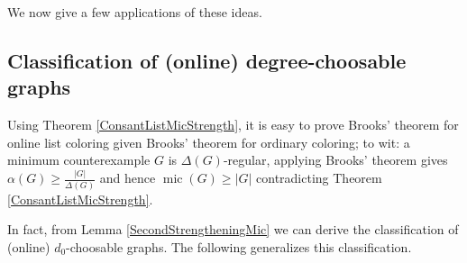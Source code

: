 \documentclass[12pt]{article}
\theoremstyle{plain}
\theoremstyle{definition}
\theoremstyle{remark}
\newcommand{\mic}{\operatorname{mic}}
\begin{document}
\noindent We now give a few applications of these ideas.

\subsection{Classification of (online) degree-choosable graphs}
Using Theorem \ref{ConsantListMicStrength}, it is easy to prove Brooks' theorem for online list coloring given Brooks' theorem for ordinary coloring; to wit: a minimum counterexample $G$ is $\Delta(G)$-regular, applying Brooks' theorem gives $\alpha(G) \ge \frac{|G|}{\Delta(G)}$ and hence $\mic(G) \ge |G|$ contradicting Theorem \ref{ConsantListMicStrength}.

In fact, from Lemma \ref{SecondStrengtheningMic} we can derive the classification of (online) $d_0$-choosable graphs.  The following generalizes this classification.
\end{document}
